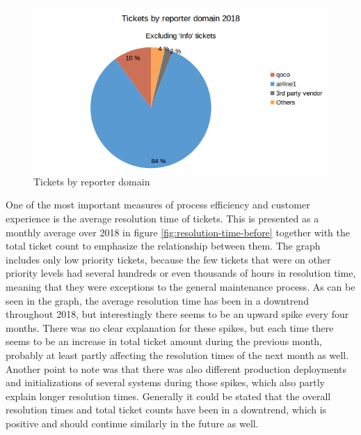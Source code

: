 \begin{figure}[ht]
  \begin{center}
    \includegraphics[width=1.0\textwidth]{images/ticket-domains-before-2.png}
    \caption{Tickets by reporter domain}
    \label{fig:ticket-domains-before}
  \end{center}
\end{figure}

One of the most important measures of process efficiency and customer experience is the average resolution time of tickets. This is presented as a monthly average over 2018 in figure
\ref{fig:resolution-time-before} together with the total ticket count to emphasize the relationship between them. The graph includes only low priority tickets, because the few tickets
that were on other priority levels had several hundreds or even thousands of hours in resolution time, meaning that they were exceptions to the general maintenance process. 
As can be seen in the graph, the average resolution time has been in a downtrend throughout 2018, but interestingly there seems to be an upward spike every four months.
There was no clear explanation for these spikes, but each time there seems to be an increase in total ticket amount during the previous month, probably at least partly affecting the
resolution times of the next month as well. Another point to note was that there was also different production deployments and initializations of several systems during those spikes,
which also partly explain longer resolution times. Generally it could be stated that the overall resolution times and total ticket counts have been in a downtrend, which is positive
and should continue similarly in the future as well.

